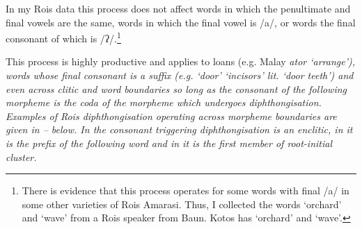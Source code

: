 In my Ro{\Q}is data this process does not affect words
in which the penultimate and final vowels are the same,
words in which the final vowel is /a/,
or words the final consonant of which is /ʔ/.\footnote{
		There is evidence that this process operates
		for some words with final /a/ in some other varieties of Ro{\Q}is Amarasi.
		Thus, I collected the words  {\la}  `orchard'
		and  {\la}  `wave' from a Ro{\Q}is speaker
		from Baun. Kotos has  `orchard' and  `wave'.}
		
This process is highly productive
and applies to loans (e.g. Malay \it{ator} {\ra}  `arrange'),
words whose final consonant is a suffix (e.g.  `door' {\ra}
 `incisors' lit. `door teeth')
and even across clitic and word boundaries
so long as the consonant of the following morpheme
is the coda of the morpheme which undergoes diphthongisation.
Examples of Ro{\Q}is diphthongisation operating across morpheme boundaries
are given in -- below.
In  the consonant triggering diphthongisation
is an enclitic, in  it is the prefix of the following
word and in  it is the first member of root-initial cluster.
		
\begin{exe}
	\label{ex:RO-170830-1, 4.26}
	\label{ex:RO-170829-1, 19.03}
	\label{ex:RO-170829-1, 17.13}
\end{exe}

